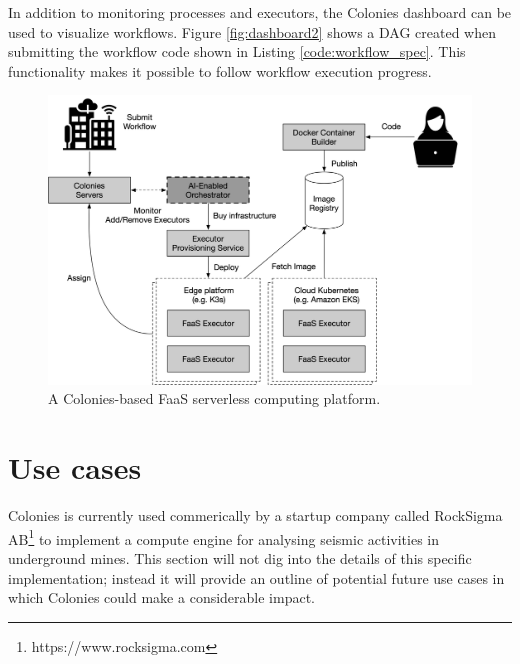 \documentclass{article}
\begin{document}

In addition to monitoring processes and executors, the Colonies dashboard can be used to visualize workflows. Figure \ref{fig:dashboard2} shows a DAG created when submitting the workflow code shown in Listing \ref{code:workflow_spec}. This functionality makes it possible to follow workflow execution progress.

\begin{figure}[h]
	\centering
    \includegraphics[scale=0.44]{cognite_faas.png}
	\caption{A Colonies-based FaaS serverless computing platform.}
	\label{fig:faas}
\end{figure}

\section{Use cases}
Colonies is currently used commerically by a startup company called RockSigma AB\footnote{https://www.rocksigma.com} to implement a compute engine for analysing seismic activities in underground mines. This section will not dig into the details of this specific implementation; instead it will provide an outline of potential future use cases in which Colonies could make a considerable impact.
\end{document}
